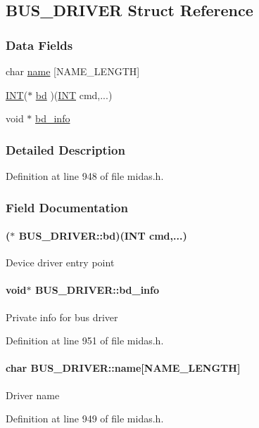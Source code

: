 \subsection{BUS\_\-DRIVER Struct Reference}
\label{structBUS__DRIVER}
\subsubsection*{Data Fields}
\begin{DoxyCompactItemize}
\item 
char \hyperlink{structBUS__DRIVER_a320d5c511c3dbe7b4c2a1d8c8acce21e}{name} \mbox{[}NAME\_\-LENGTH\mbox{]}
\item 
\hyperlink{vppg_8h_a392e62da233ed3e2f7c3fd4f487a3896}{INT}($\ast$ \hyperlink{structBUS__DRIVER_adf56605f2072275795fd4a3597a8a929}{bd} )(\hyperlink{vppg_8h_a392e62da233ed3e2f7c3fd4f487a3896}{INT} cmd,...)
\item 
void $\ast$ \hyperlink{structBUS__DRIVER_a6cb2c84f7e3f45e66c6b64b4cceefc4c}{bd\_\-info}
\end{DoxyCompactItemize}


\subsubsection{Detailed Description}


Definition at line 948 of file midas.h.

\subsubsection{Field Documentation}
\paragraph[{bd}]{($\ast$ {\bf BUS\_\-DRIVER::bd})({\bf INT} cmd,...)}\hfill\label{structBUS__DRIVER_adf56605f2072275795fd4a3597a8a929}
Device driver entry point 
\paragraph[{bd\_\-info}]{\setlength{\rightskip}{0pt plus 5cm}void$\ast$ {\bf BUS\_\-DRIVER::bd\_\-info}}\hfill\label{structBUS__DRIVER_a6cb2c84f7e3f45e66c6b64b4cceefc4c}
Private info for bus driver 

Definition at line 951 of file midas.h.
\paragraph[{name}]{\setlength{\rightskip}{0pt plus 5cm}char {\bf BUS\_\-DRIVER::name}\mbox{[}NAME\_\-LENGTH\mbox{]}}\hfill\label{structBUS__DRIVER_a320d5c511c3dbe7b4c2a1d8c8acce21e}
Driver name 

Definition at line 949 of file midas.h.